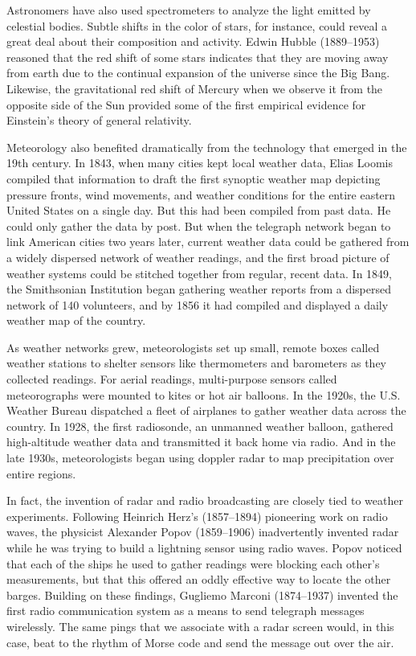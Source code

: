 Astronomers have also used spectrometers to analyze the light emitted by
celestial bodies. Subtle shifts in the color of stars, for instance, could reveal a
great deal about their composition and activity. Edwin Hubble (1889–1953)
reasoned that the red shift of some stars indicates that they are moving
away from earth due to the continual expansion of the universe since the
Big Bang. Likewise, the gravitational red shift of Mercury when we observe
it from the opposite side of the Sun provided some of the first empirical
evidence for Einstein's theory of general relativity.

Meteorology also benefited dramatically from the technology that emerged
in the 19th century. In 1843, when many cities kept local weather data, Elias
Loomis compiled that information to draft the first synoptic weather map
depicting pressure fronts, wind movements, and weather conditions for the
entire eastern United States on a single day. But this had been compiled from
past data. He could only gather the data by post. But when the telegraph
network began to link American cities two years later, current weather data
could be gathered from a widely dispersed network of weather readings,
and the first broad picture of weather systems could be stitched together
from regular, recent data. In 1849, the Smithsonian Institution began gathering
weather reports from a dispersed network of 140 volunteers, and by
1856 it had compiled and displayed a daily weather map of the country.

As weather networks grew, meteorologists set up small, remote boxes called
weather stations to shelter sensors like thermometers and barometers as
they collected readings. For aerial readings, multi-purpose sensors called
meteorographs were mounted to kites or hot air balloons. In the 1920s, the
U.S. Weather Bureau dispatched a fleet of airplanes to gather weather data
across the country. In 1928, the first radiosonde, an unmanned weather balloon,
gathered high-altitude weather data and transmitted it back home via
radio. And in the late 1930s, meteorologists began using doppler radar to
map precipitation over entire regions.

In fact, the invention of radar and radio broadcasting are closely tied to
weather experiments. Following Heinrich Herz's (1857–1894) pioneering
work on radio waves, the physicist Alexander Popov (1859–1906) inadvertently
invented radar while he was trying to build a lightning sensor using
radio waves. Popov noticed that each of the ships he used to gather readings
were blocking each other's measurements, but that this offered an oddly
effective way to locate the other barges. Building on these findings, Gugliemo
Marconi (1874–1937) invented the first radio communication system
as a means to send telegraph messages wirelessly. The same pings that
we associate with a radar screen would, in this case, beat to the rhythm of
Morse code and send the message out over the air.

